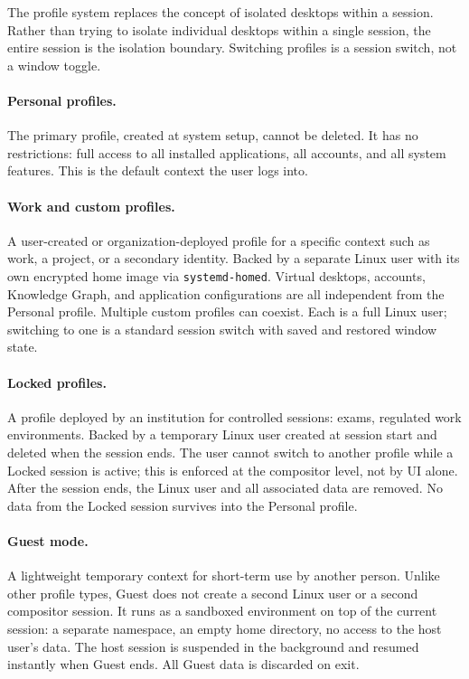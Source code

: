 The profile system replaces the concept of isolated desktops within a session.
Rather than trying to isolate individual desktops within a single session, the
entire session is the isolation boundary. Switching profiles is a session
switch, not a window toggle.

\paragraph{Personal profiles.}
The primary profile, created at system setup, cannot be deleted. It has no
restrictions: full access to all installed applications, all accounts, and all
system features. This is the default context the user logs into.

\paragraph{Work and custom profiles.}
A user-created or organization-deployed profile for a specific context such as
work, a project, or a secondary identity. Backed by a separate Linux user with
its own encrypted home image via \texttt{systemd-homed}. Virtual desktops,
accounts, Knowledge Graph, and application configurations are all independent
from the Personal profile. Multiple custom profiles can coexist. Each is a
full Linux user; switching to one is a standard session switch with saved and
restored window state.

\paragraph{Locked profiles.}
A profile deployed by an institution for controlled sessions: exams, regulated
work environments. Backed by a temporary Linux user created at session start
and deleted when the session ends. The user cannot switch to another profile
while a Locked session is active; this is enforced at the compositor level, not
by UI alone. After the session ends, the Linux user and all associated data are
removed. No data from the Locked session survives into the Personal profile.

\paragraph{Guest mode.}
A lightweight temporary context for short-term use by another person. Unlike
other profile types, Guest does not create a second Linux user or a second
compositor session. It runs as a sandboxed environment on top of the current
session: a separate namespace, an empty home directory, no access to the host
user's data. The host session is suspended in the background and resumed
instantly when Guest ends. All Guest data is discarded on exit.

